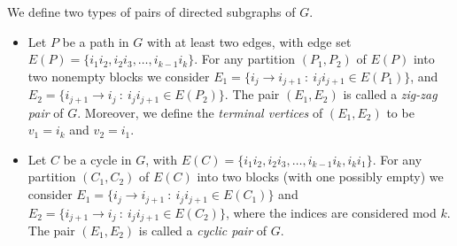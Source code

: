 \begin{defi}
    We define two types of pairs of directed subgraphs of $G$.
    \begin{itemize}
        \item[(i)] Let $P$ be a path in $G$ with at least two edges, with edge set $E(P)=\{i_1i_2,i_2i_3,\dots,i_{k-1}i_k\}$. For any partition $(P_1,P_2)$ of $E(P)$ into two nonempty blocks we consider $E_1 = \{i_{j}\to i_{j+1} ~ : ~ i_{j}i_{j+1}\in E(P_1)\}$, and $E_2 = \{i_{j+1}\to i_{j} ~ : ~ i_{j}i_{j+1}\in E(P_2)\}$. The pair $(E_1,E_2)$ is called a \emph{zig-zag pair} of $G$.
        Moreover, we define the  \emph{terminal vertices} of $(E_1,E_2)$ to be $v_1=i_k$ and $v_2=i_1$.
        \item[(ii)] Let $C$ be a cycle in $G$, with $E(C)=\{i_1i_2,i_2i_3,\dots,i_{k-1}i_k, i_ki_1\}$. For any partition $(C_1,C_2)$ of $E(C)$ into two blocks (with one possibly empty) we consider $E_1 = \{i_{j}\to i_{j+1} ~ : ~ i_{j}i_{j+1}\in E(C_1)\}$ and $E_2 = \{i_{j+1}\to i_{j} ~ : ~ i_{j}i_{j+1}\in E(C_2)\}$, where the indices are considered mod $k$. The pair $(E_1,E_2)$ is called a \emph{cyclic pair} of $G$.
    \end{itemize}
\end{defi}





